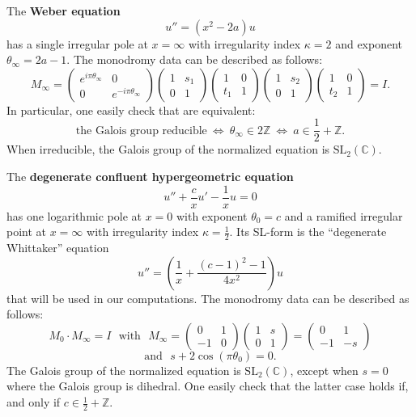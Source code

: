 \documentclass[12]{amsart}
\newcommand{\SL}{\mathrm{SL}_2}
\begin{document}
The {\bf Weber equation}
\begin{equation}\label{eq:Weber}
u''=(x^2-2a)u
\end{equation}
has a single irregular pole at $x=\infty$ with irregularity index $\kappa=2$ and exponent $\theta_\infty=2a-1$.
The monodromy data can be described as follows:
$$M_\infty=\begin{pmatrix}e^{i\pi\theta_\infty}&0\\ 0&e^{-i\pi\theta_\infty}\end{pmatrix}
\begin{pmatrix}1&s_1\\ 0&1\end{pmatrix}\begin{pmatrix}1&0\\ t_1&1\end{pmatrix}
\begin{pmatrix}1&s_2\\ 0&1\end{pmatrix}\begin{pmatrix}1&0\\ t_2&1\end{pmatrix}=I.$$
In particular, one easily check that are equivalent:
$$\text{the Galois group reducible}\ \Leftrightarrow\ \theta_\infty\in 2\mathbb Z
\ \Leftrightarrow\ a\in\frac{1}{2} +\mathbb Z.$$
When irreducible, the Galois group of the normalized equation is $\SL(\mathbb C)$.


The {\bf degenerate confluent hypergeometric equation}
\begin{equation}\label{eq:DC}
u''+\frac{c}{x}u'-\frac{1}{x}u=0
\end{equation}
has one logarithmic pole at $x=0$ with exponent $\theta_0=c$ and a ramified irregular point at $x=\infty$
with irregularity index $\kappa=\frac{1}{2}$. Its SL-form is the ``degenerate Whittaker'' equation
\begin{equation}\label{eq:DW}
u''=\left(\frac{1}{x}+\frac{(c-1)^2-1}{4x^2}\right)u
\end{equation}
that will be used in our computations. The monodromy data can be described as follows:
$$M_0\cdot M_\infty=I\ \ \ \text{with}\ \ \ M_\infty=\begin{pmatrix}0&1\\ -1&0\end{pmatrix}
\begin{pmatrix}1&s\\ 0&1\end{pmatrix}=\begin{pmatrix}0&1\\ -1&-s\end{pmatrix}$$
$$\text{and}\ \ \ s+2\cos(\pi\theta_0)=0.$$
The Galois group of the normalized equation is $\SL(\mathbb C)$, except when $s=0$
where the Galois group is dihedral. One easily check that the latter case holds if, and only if $c\in\frac{1}{2}+\mathbb Z$.
\end{document}
